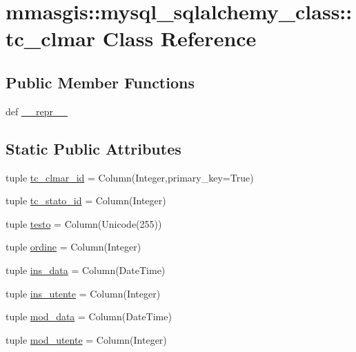 \hypertarget{classmmasgis_1_1mysql__sqlalchemy__class_1_1tc__clmar}{
\section{mmasgis::mysql\_\-sqlalchemy\_\-class::tc\_\-clmar Class Reference}
\label{classmmasgis_1_1mysql__sqlalchemy__class_1_1tc__clmar}
}
\subsection*{Public Member Functions}
\begin{DoxyCompactItemize}
\item 
def \hyperlink{classmmasgis_1_1mysql__sqlalchemy__class_1_1tc__clmar_a1ca40d76bbc77ee30dd0f7e3f6df2cf2}{\_\-\_\-repr\_\-\_\-}
\end{DoxyCompactItemize}
\subsection*{Static Public Attributes}
\begin{DoxyCompactItemize}
\item 
tuple \hyperlink{classmmasgis_1_1mysql__sqlalchemy__class_1_1tc__clmar_a4b74212398af7e631309d7d8f7a2c148}{tc\_\-clmar\_\-id} = Column(Integer,primary\_\-key=True)
\item 
tuple \hyperlink{classmmasgis_1_1mysql__sqlalchemy__class_1_1tc__clmar_a32c42b16d1855f84df5b919b956b0558}{tc\_\-stato\_\-id} = Column(Integer)
\item 
tuple \hyperlink{classmmasgis_1_1mysql__sqlalchemy__class_1_1tc__clmar_a7633692dc0b9210daa5c8875c68936bc}{testo} = Column(Unicode(255))
\item 
tuple \hyperlink{classmmasgis_1_1mysql__sqlalchemy__class_1_1tc__clmar_ae8d16cca495cf5cc4bad505683b19f7e}{ordine} = Column(Integer)
\item 
tuple \hyperlink{classmmasgis_1_1mysql__sqlalchemy__class_1_1tc__clmar_a951e2126aecb64ae6d744d5ebe561402}{ins\_\-data} = Column(DateTime)
\item 
tuple \hyperlink{classmmasgis_1_1mysql__sqlalchemy__class_1_1tc__clmar_adcb91625bb05fcafda1a4a669eda0858}{ins\_\-utente} = Column(Integer)
\item 
tuple \hyperlink{classmmasgis_1_1mysql__sqlalchemy__class_1_1tc__clmar_a78dd89c068df38f9b0e0ca0ca412ce87}{mod\_\-data} = Column(DateTime)
\item 
tuple \hyperlink{classmmasgis_1_1mysql__sqlalchemy__class_1_1tc__clmar_a53b43405b56077bc1dc271273e00a71c}{mod\_\-utente} = Column(Integer)
\end{DoxyCompactItemize}
